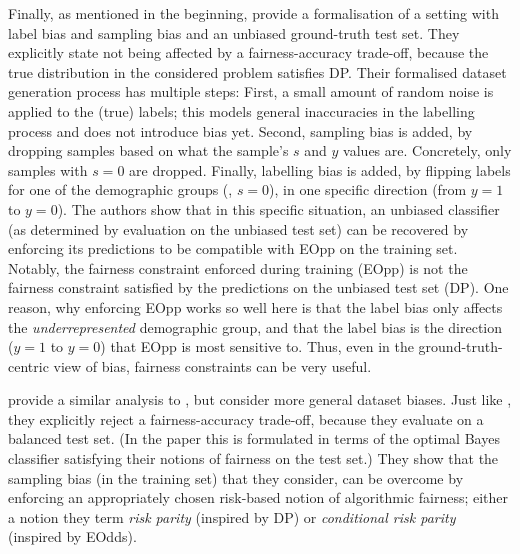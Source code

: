 Finally, as mentioned in the beginning,
\citet{blum2020recovering} provide a formalisation of a setting with label bias and sampling bias
and an unbiased ground-truth test set.
They explicitly state not being affected by a fairness-accuracy trade-off,
because the true distribution in the considered problem satisfies \acf{DP}.
Their formalised dataset generation process has multiple steps:
First, a small amount of random noise is applied to the (true) labels;
this models general inaccuracies in the labelling process and does not introduce bias yet.
Second, sampling bias is added, by dropping samples based on what the sample's \(s\) and \(y\) values are.
Concretely, only samples with \(s=0\) are dropped.
Finally, labelling bias is added, by flipping labels for one of the demographic groups (\eg, \(s=0\)),
in one specific direction (from \(y=1\) to \(y=0\)).
The authors show that in this specific situation,
an unbiased classifier (as determined by evaluation on the unbiased test set) can be recovered
by enforcing its predictions to be compatible with \acf{EOpp} on the training set.
Notably, the fairness constraint enforced during training (\ac{EOpp})
is not the fairness constraint satisfied by the predictions on the unbiased test set (\ac{DP}).
One reason, why enforcing \ac{EOpp} works so well here is
that the label bias only affects the \emph{underrepresented} demographic group,
and that the label bias is the direction (\(y=1\) to \(y=0\)) that \ac{EOpp} is most sensitive to.
Thus, even in the ground-truth-centric view of bias,
fairness constraints can be very useful.

\citet{maity2020notradeoff} provide a similar analysis to \citet{blum2020recovering},
but consider more general dataset biases.
Just like \citet{blum2020recovering}, they explicitly reject a fairness-accuracy trade-off,
because they evaluate on a balanced test set.
(In the paper this is formulated in terms of the optimal Bayes classifier satisfying their notions of fairness on the test set.)
They show that the sampling bias (in the training set) that they consider,
can be overcome by enforcing an appropriately chosen risk-based notion of algorithmic fairness;
either a notion they term \emph{risk parity} (inspired by \ac{DP})
or \emph{conditional risk parity} (inspired by \ac{EOdds}).

